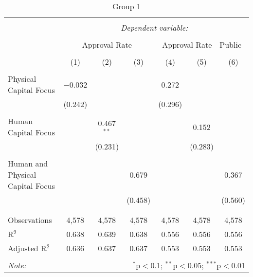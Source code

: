 
\begin{table}[!htbp] \centering 
  \caption{Group 1} 
  \label{} 
\begin{tabular}{@{\extracolsep{5pt}}lcccccc} 
\\[-1.8ex]\hline 
\hline \\[-1.8ex] 
 & \multicolumn{6}{c}{\textit{Dependent variable:}} \\ 
\cline{2-7} 
\\[-1.8ex] & \multicolumn{3}{c}{Approval Rate} & \multicolumn{3}{c}{Approval Rate - Public} \\ 
\\[-1.8ex] & (1) & (2) & (3) & (4) & (5) & (6)\\ 
\hline \\[-1.8ex] 
 Physical Capital Focus & $-$0.032 &  &  & 0.272 &  &  \\ 
  & (0.242) &  &  & (0.296) &  &  \\ 
  & & & & & & \\ 
 Human Capital Focus &  & 0.467$^{**}$ &  &  & 0.152 &  \\ 
  &  & (0.231) &  &  & (0.283) &  \\ 
  & & & & & & \\ 
 Human and Physical Capital Focus &  &  & 0.679 &  &  & 0.367 \\ 
  &  &  & (0.458) &  &  & (0.560) \\ 
  & & & & & & \\ 
\hline \\[-1.8ex] 
Observations & 4,578 & 4,578 & 4,578 & 4,578 & 4,578 & 4,578 \\ 
R$^{2}$ & 0.638 & 0.639 & 0.638 & 0.556 & 0.556 & 0.556 \\ 
Adjusted R$^{2}$ & 0.636 & 0.637 & 0.637 & 0.553 & 0.553 & 0.553 \\ 
\hline 
\hline \\[-1.8ex] 
\textit{Note:}  & \multicolumn{6}{r}{$^{*}$p$<$0.1; $^{**}$p$<$0.05; $^{***}$p$<$0.01} \\ 
\end{tabular} 
\end{table} 
